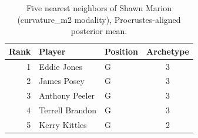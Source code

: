 \begin{table}[htbp]
  \centering\small
  \begin{tabular}{rllc}
    \toprule
    Rank & Player & Position & Archetype \\
    \midrule
    1 & Eddie Jones & G & 3 \\
    2 & James Posey & G & 3 \\
    3 & Anthony Peeler & G & 3 \\
    4 & Terrell Brandon & G & 3 \\
    5 & Kerry Kittles & G & 2 \\
    \bottomrule
  \end{tabular}
  \caption{Five nearest neighbors of Shawn Marion (curvature_m2 modality), Procrustes-aligned posterior mean.}
  \label{tab:Shawn_Marion_neighbors_curvature_m2}
\end{table}

